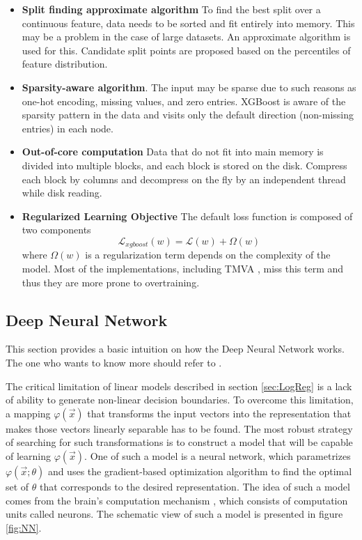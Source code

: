 \begin{itemize}
    \item \textbf{Split finding approximate algorithm} To find the best split over a continuous feature, data needs to be sorted and fit entirely into memory. This may be a problem in the case of large datasets.
    An approximate algorithm is used for this. Candidate split points are proposed based on the percentiles of feature distribution.
    \item  \textbf{Sparsity-aware algorithm}. The input may be sparse due to such reasons as one-hot encoding, missing values, and zero entries. XGBoost is aware of the sparsity pattern in the data and visits only the default direction (non-missing entries) in each node.
    \item  \textbf{Out-of-core computation} 
    Data that do not fit into main memory is divided into multiple blocks, and each block is stored on the disk. Compress each block by columns and decompress on the fly by an independent thread while disk reading.
    \item \textbf{Regularized Learning Objective} The default loss function is composed of two components 
    \begin{equation}
        \mathcal{L}_{xgboost}(w) = \mathcal{L}(w) + \Omega(w)
    \end{equation}
    where $\Omega(w)$ is a  regularization term depends on the complexity of the model. Most of the implementations, including TMVA \cite{TMVA}, miss this term and thus they are more prone to overtraining. 
\end{itemize}


\subsection{Deep Neural Network}
\label{sec:DNN}
This section provides a basic intuition on how the Deep Neural Network works. The one who wants to know more should refer to \cite{DLBook}.  

The critical limitation of linear models described in section \ref{sec:LogReg} is a lack of ability to generate non-linear decision boundaries. To overcome this limitation, a mapping $\varphi(\vec{x})$ that transforms the input vectors into the representation that makes those vectors linearly separable has to be found. The most robust strategy of searching for such transformations is to construct a model that will be capable of learning $\varphi(\vec{x})$. One of such a model is a neural network, which parametrizes $\varphi(\vec{x};\theta)$ and uses the gradient-based optimization algorithm to find the optimal set of $\theta$ that corresponds to the desired representation. The idea of such a model comes from the brain's computation mechanism \cite{NN_brain}, which consists of computation units called neurons. The schematic view of such a model is presented in figure \ref{fig:NN}. 

